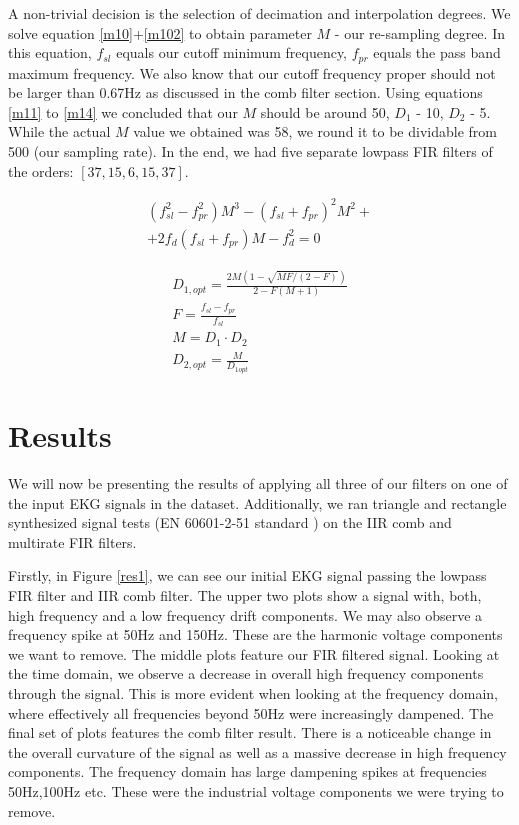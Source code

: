 \documentclass[10pt,a4paper,twocolumn]{article}
\begin{document}
A non-trivial decision is the selection of decimation and interpolation degrees. We solve equation \ref{m10}+\ref{m102} to obtain parameter $M$ - our re-sampling degree. In this equation, $f_{sl}$ equals our cutoff minimum frequency, $f_{pr}$ equals the pass band maximum frequency. We also know that our cutoff frequency proper should not be larger than 0.67Hz as discussed in the comb filter section. Using equations \ref{m11} to \ref{m14} we concluded that our $M$ should be around 50, $D_1$ - 10, $D_2$ - 5. While the actual $M$ value we obtained was 58, we round it to be dividable from 500 (our sampling rate). In the end, we had five separate lowpass FIR filters of the orders: $[37,15,6,15,37]$.

\begin{eqnarray}
\label{m10}
(f_{sl}^2-f_{pr}^2)M^3 - (f_{sl}+f_{pr})^2M^2 + \\
\label{m102}
+ 2f_d(f_{sl}+f_{pr})M - f_d^2 = 0
\end{eqnarray}


\begin{eqnarray}
\label{m11}
D_{1,opt} = \frac{2M(1-\sqrt{MF/(2-F)})}{2-F(M+1)} \\
F = \frac{f_{sl} - f_{pr}}{f_{sl}} \\
M = D_1 \cdot D_2 \\
D_{2,opt} = \frac{M}{D_{1opt}}
\label{m14}
\end{eqnarray}

\section*{Results}

We will now be presenting the results of applying all three of our filters on one of the input EKG signals in the dataset. Additionally, we ran triangle and rectangle synthesized signal tests (EN 60601-2-51 standard \cite{standard}) on the IIR comb and multirate FIR filters.

Firstly, in Figure \ref{res1}, we can see our initial EKG signal passing the lowpass FIR filter and IIR comb filter.  The upper two plots show a signal with, both, high frequency and a low frequency drift components. We may also observe a frequency spike at 50Hz and 150Hz. These are the harmonic voltage components we want to remove. The middle plots feature our FIR filtered signal. Looking at the time domain, we observe a decrease in overall high frequency components through the signal. This is more evident when looking at the frequency domain, where effectively all frequencies beyond 50Hz were increasingly dampened. The final set of plots features the comb filter result. There is a noticeable change in the overall curvature of the signal as well as a massive decrease in high frequency components. The frequency domain has large dampening spikes at frequencies 50Hz,100Hz etc. These were the industrial voltage components we were trying to remove. 
\end{document}
